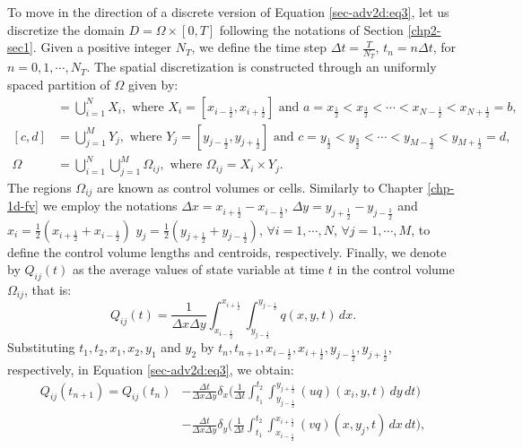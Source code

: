 To move in the direction of a discrete version of Equation \eqref{sec-adv2d:eq3},
let us discretize the domain $D = \Omega \times [0,T]$ following 
the notations of Section \ref{chp2-sec1}.
Given a positive integer $N_T$, we define the time step 
$\Delta t = \frac{T}{N_T}$, $t_n = n \Delta t$, for $n = 0, 1 ,\cdots, N_T$.
The spatial discretization is constructed through an uniformly spaced partition of $\Omega$ given by:
\begin{align}
	[a,b] &= \bigcup_{i=1}^N X_i, 
	\text{ where } X_i= [x_{i-\frac{1}{2}}, x_{i+\frac{1}{2}}] \text{ and } 
	a = x_{\frac{1}{2}} < x_{\frac{3}{2}} < \cdots < x_{N-\frac{1}{2}} < x_{N+\frac{1}{2}} = b, \\
	[c,d] &= \bigcup_{j=1}^M Y_j, 
\text{ where } Y_j= [y_{j-\frac{1}{2}}, y_{j+\frac{1}{2}}] \text{ and } 
	c = y_{\frac{1}{2}} < y_{\frac{3}{2}} < \cdots < y_{M-\frac{1}{2}} < y_{M+\frac{1}{2}} = d, \\
    \Omega &=  \bigcup_{i=1}^N \bigcup_{j=1}^M \Omega_{ij}, \text{ where } \Omega_{ij} = X_i \times Y_j.
\end{align}
The regions $\Omega_{ij}$ are known as control volumes or cells. 
Similarly to  Chapter \ref{chp-1d-fv} we employ the notations
$\Delta x = x_{i+\frac{1}{2}} - x_{i-\frac{1}{2}}$,
$\Delta y = y_{j+\frac{1}{2}} - y_{j-\frac{1}{2}}$ 
and $x_i = \frac{1}{2}(x_{i+\frac{1}{2}} + x_{i-\frac{1}{2}})$
$y_j = \frac{1}{2}(y_{j+\frac{1}{2}} + y_{j-\frac{1}{2}})$, $\forall i = 1, \cdots, N$, 
$\forall j = 1, \cdots, M$,
to define the control volume lengths and centroids, respectively.
Finally, we denote by ${Q}_{ij}(t)$ as the
average values of state variable at time $t$
in the control volume $\Omega_{ij}$, that is:
\begin{equation}
	\label{sec-adv2d:eq4}
	{Q}_{ij}(t) = \frac{1}{\Delta x \Delta y}
	\int_{x_{i-\frac{1}{2}}}^{x_{i+\frac{1}{2}}} \int_{y_{j-\frac{1}{2}}}^{y_{j-\frac{1}{2}}} {q}(x,y,t) \,dx.
\end{equation}
Substituting $t_1, t_2, x_1, x_2, y_1$ and $y_2$ by 
$t_{n}, t_{n+1}, x_{i-\frac{1}{2}}, x_{i+\frac{1}{2}}, y_{j-\frac{1}{2}}, y_{j+\frac{1}{2}}$,
respectively, in Equation \eqref{sec-adv2d:eq3}, we obtain:
\begin{align}
	\label{sec-adv2d:eq5}
	{Q}_{ij}(t_{n+1})  = {Q}_{ij}(t_{n})
	&- \frac{\Delta t}{\Delta x \Delta y}
	\delta _x \bigg( \frac{1}{\Delta t}
	\int_{t_1}^{t_2} \int_{y_{j-\frac{1}{2}}}^{y_{j+\frac{1}{2}}} 
	{(uq)}(x_{i}, y, t)
	\,dy \,dt \bigg) \\ \nonumber
	&- \frac{\Delta t}{\Delta x \Delta y}
	\delta _y \bigg( \frac{1}{\Delta t}
	\int_{t_1}^{t_2} \int_{x_{i-\frac{1}{2}}}^{x_{i+\frac{1}{2}}} 
	{(vq)}(x, y_{j}, t)
	\,dx \,dt \bigg),
\end{align}
